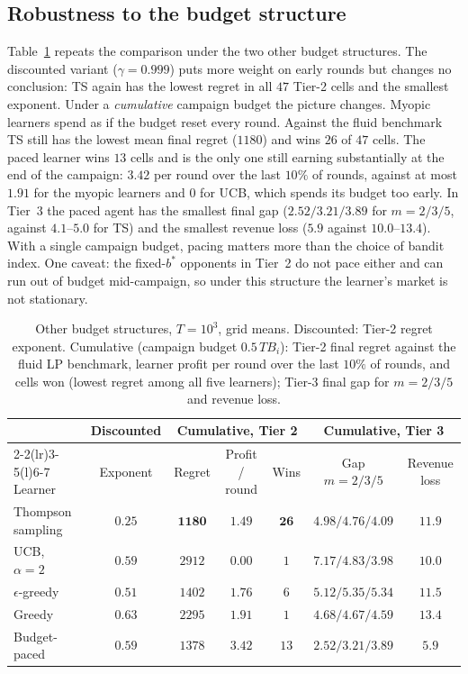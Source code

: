 \documentclass{article}
\theoremstyle{definition}
\begin{document}
\subsection{Robustness to the budget structure}
Table~\ref{tab:robust} repeats the comparison under the two other budget structures. The discounted variant
($\gamma=0.999$) puts more weight on early rounds but changes no conclusion: TS again has the lowest regret in
all $47$ Tier-2 cells and the smallest exponent. Under a \emph{cumulative} campaign budget the picture changes.
Myopic learners spend as if the budget reset every round. Against the fluid benchmark TS still has the
lowest mean final regret ($1180$) and wins $26$ of $47$ cells. The paced learner wins $13$ cells and is the
only one still earning substantially at the end of the campaign: $3.42$ per round over the last $10\%$ of
rounds, against at most $1.91$ for the myopic learners and $0$ for UCB, which spends its budget too early. In Tier~3 the paced agent has the smallest final gap
($2.52/3.21/3.89$ for $m=2/3/5$, against $4.1$--$5.0$ for TS) and the smallest revenue loss ($5.9$ against
$10.0$--$13.4$). With a single campaign budget, pacing matters more than the choice of bandit index. One
caveat: the fixed-$b^\ast$ opponents in Tier~2 do not pace either and can run out of budget mid-campaign, so
under this structure the learner's market is not stationary.

\begin{table}[t]
\caption{Other budget structures, $T=10^3$, grid means. Discounted: Tier-2 regret exponent. Cumulative
(campaign budget $0.5\,TB_i$): Tier-2 final regret against the fluid LP benchmark, learner profit per round
over the last $10\%$ of rounds, and cells won (lowest regret among all five learners); Tier-3 final gap for $m=2/3/5$ and revenue loss.}
\label{tab:robust}
\centering\small
\begin{tabular}{@{}lcccccc@{}}
\toprule
 & Discounted & \multicolumn{3}{c}{Cumulative, Tier 2} & \multicolumn{2}{c}{Cumulative, Tier 3}\\
\cmidrule(lr){2-2}\cmidrule(lr){3-5}\cmidrule(l){6-7}
Learner & Exponent & Regret & Profit / round & Wins & Gap $m=2/3/5$ & Revenue loss\\
\midrule
Thompson sampling & $\mathbf{0.25}$ & $\mathbf{1180}$ & $1.49$ & $\mathbf{26}$ & $4.98/4.76/4.09$ & $11.9$\\
UCB, $\alpha=2$ & $0.59$ & $2912$ & $0.00$ & $1$ & $7.17/4.83/3.98$ & $10.0$\\
$\epsilon$-greedy & $0.51$ & $1402$ & $1.76$ & $6$ & $5.12/5.35/5.34$ & $11.5$\\
Greedy & $0.63$ & $2295$ & $1.91$ & $1$ & $4.68/4.67/4.59$ & $13.4$\\
Budget-paced & $0.59$ & $1378$ & $\mathbf{3.42}$ & $13$ & $\mathbf{2.52/3.21/3.89}$ & $\mathbf{5.9}$\\
\bottomrule
\end{tabular}
\end{table}
\end{document}
